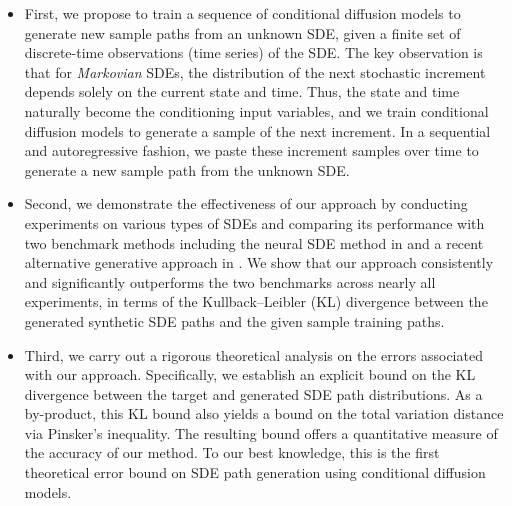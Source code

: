 \documentclass[11pt]{article}
\begin{document}
\begin{itemize}
\item First, we propose to train a sequence of conditional diffusion models to generate new sample paths from an unknown SDE, given a finite set of discrete-time observations (time series) of the SDE. The key observation is that for {\it Markovian} SDEs, the distribution of the next stochastic increment depends solely on the current state and time.
Thus, the state and time naturally become the conditioning input variables, and we train conditional diffusion models to
generate a sample of the next increment. In a sequential and autoregressive fashion, we paste these increment samples over time to generate a new sample path from the unknown SDE.



\item Second, we demonstrate the effectiveness of our approach by conducting experiments on various types of SDEs and comparing its performance with two benchmark methods including the neural SDE method in \cite{kidger2021neural} and a recent alternative generative approach in \cite{liu2025training}. We show that
our approach consistently and significantly outperforms the two benchmarks across nearly all experiments, in terms of the Kullback--Leibler (KL) divergence between the generated synthetic SDE paths and the given sample training paths.



\item Third, we carry out a rigorous theoretical analysis on the errors associated with our approach. Specifically, we establish an explicit bound on the KL divergence between the target and generated SDE path distributions. As a by-product, this KL bound also yields a bound on the total variation distance via Pinsker's inequality. The resulting bound offers a quantitative measure of the accuracy of our method. To our best knowledge, this is the first theoretical error bound on SDE path generation using conditional diffusion models.





\end{itemize}
\end{document}
